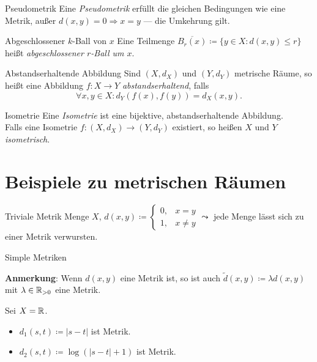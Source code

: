 \begin{definition}{Pseudometrik}
   Eine \emph{Pseudometrik} erfüllt die gleichen Bedingungen wie eine Metrik, außer $ d(x,y) = 0 \Rightarrow x = y $ --- die Umkehrung gilt.
\end{definition}

\begin{definition}{Abgeschlossener $ k $-Ball von $ x $}
  Eine Teilmenge $ \overline{B_r(x)} \coloneqq \{ y \in X : d(x,y) \leq r \} $ heißt \emph{abgeschlossener $ r $-Ball um $ x $}.
\end{definition}

\begin{definition}{Abstandserhaltende Abbildung}
  Sind $ (X, d_X) $ und $ (Y, d_Y) $ metrische Räume, so heißt eine Abbildung $ f: X \to Y $ \emph{abstandserhaltend}, falls
  \begin{equation*}
    \forall x, y \in X: d_Y(f(x), f(y)) = d_X(x, y)\text{.}
  \end{equation*}
\end{definition}

\begin{definition}{Isometrie}
  Eine \emph{Isometrie} ist eine bijektive, abstandserhaltende Abbildung. \\
  Falls eine Isometrie $ f: (X, d_X) \to (Y, d_Y) $ existiert, so heißen $ X $ und $ Y $ \emph{isometrisch}.
\end{definition}

\section{Beispiele zu metrischen Räumen}

\begin{example}{Triviale Metrik}
  Menge $ X $, $ d(x, y) \coloneqq \begin{cases}
    0, &x = y \\
    1, & x \neq y
  \end{cases} \leadsto $ jede Menge lässt sich zu einer Metrik verwursten. 
\end{example}

\begin{example}{Simple Metriken}
  \begin{marginfigure}
    \textbf{Anmerkung}: Wenn $ d(x, y) $ eine Metrik ist, so ist auch $ \widetilde{d}(x, y) \coloneqq \lambda d(x, y) $ mit $ \lambda \in \mathbb{R}_{>0} $ eine Metrik.
  \end{marginfigure}
  Sei $ X = \mathbb{R} $.
  \begin{itemize}
    \item $ d_1(s, t) \coloneqq |s-t| $ ist Metrik.
    \item $ d_2(s, t) \coloneqq \log(|s-t|+1) $ ist Metrik.
  \end{itemize}
\end{example}

